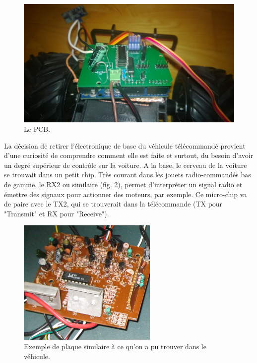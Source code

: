 \documentclass[a4paper,11pt]{report}
\begin{document}
{\begin{figure}[h!]
\centering
\includegraphics[width=1.0\textwidth]{figures/PCB.jpg}
    \caption{\label{PCB} Le PCB.
    }
\end{figure}

La décision de retirer l'électronique de base du véhicule télécommandé
provient d'une curiosité de comprendre comment elle est faite et surtout, du
besoin d'avoir un degré supérieur de contrôle sur la voiture. A la base, le
cerveau de la voiture se trouvait dans un petit chip. Très courant dans les
jouets radio-commandés bas de gamme, le RX2 ou similaire (fig. \ref{rx2.2}), permet d'interpréter
un signal radio et émettre des signaux pour actionner des moteurs, par
exemple. Ce micro-chip va de paire avec le TX2, qui se trouverait dans la
télécommande (TX pour "Transmit" et RX pour "Receive").


\begin{figure}[h]
\centering
\includegraphics[width=0.6\textwidth]{figures/rx2_ex2.jpg}
    \caption[Exemple de plaque RX2]{\label{rx2.2}Exemple de plaque similaire à ce qu'on a pu trouver
      dans le véhicule.}
\end{figure}

}
\end{document}
